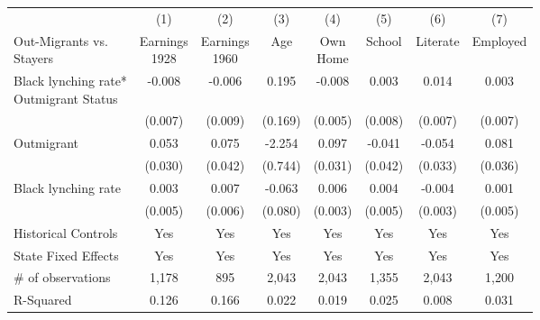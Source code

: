 {
\def\sym#1{\ifmmode^{#1}\else\(^{#1}\)\fi}
\begin{tabular}{l*{7}{c}}
\hline\hline
                    &\multicolumn{1}{c}{(1)}&\multicolumn{1}{c}{(2)}&\multicolumn{1}{c}{(3)}&\multicolumn{1}{c}{(4)}&\multicolumn{1}{c}{(5)}&\multicolumn{1}{c}{(6)}&\multicolumn{1}{c}{(7)}\\
\makecell[l]{Out-Migrants vs.\\Stayers}&\makecell{Earnings\\1928}&\makecell{Earnings\\1960}&         Age&\makecell{Own\\Home}&      School&    Literate&    Employed\\
\hline
\makecell[l]{Black lynching rate*\\Outmigrant Status}&      -0.008&      -0.006&       0.195&      -0.008&       0.003&       0.014&       0.003\\
                    &     (0.007)&     (0.009)&     (0.169)&     (0.005)&     (0.008)&     (0.007)&     (0.007)\\
Outmigrant          &       0.053&       0.075&      -2.254&       0.097&      -0.041&      -0.054&       0.081\\
                    &     (0.030)&     (0.042)&     (0.744)&     (0.031)&     (0.042)&     (0.033)&     (0.036)\\
Black lynching rate &       0.003&       0.007&      -0.063&       0.006&       0.004&      -0.004&       0.001\\
                    &     (0.005)&     (0.006)&     (0.080)&     (0.003)&     (0.005)&     (0.003)&     (0.005)\\
Historical Controls &         Yes&         Yes&         Yes&         Yes&         Yes&         Yes&         Yes\\
State Fixed Effects &         Yes&         Yes&         Yes&         Yes&         Yes&         Yes&         Yes\\
\hline
\# of observations  &       1,178&         895&       2,043&       2,043&       1,355&       2,043&       1,200\\
R-Squared           &       0.126&       0.166&       0.022&       0.019&       0.025&       0.008&       0.031\\
\hline\hline
\end{tabular}
}
